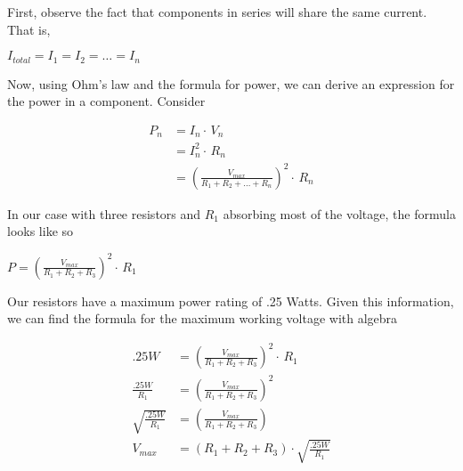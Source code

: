 \documentclass[journal]{IEEEtran}
\begin{document}



First, observe the fact that components in series will share the same current. That is,

\vspace{3mm}
$I_{total}=I_{1}=I_{2}=\dots=I_{n}$
\vspace{3mm}

Now, using Ohm's law and the formula for power, we can derive an expression for the power
in a component. Consider

\begin{align*}
P_{n}&=I_{n}\cdot\,V_{n}\\
&=I_{n}^{2}\cdot\,R_{n}\\
&=\left(\frac{V_{max}}{R_{1}+R_{2}+\dots+R_{n}}\right)^{2}\cdot\,R_{n}
\end{align*}

In our case with three resistors and $R_{1}$ absorbing most of the voltage, the formula
looks like so

\vspace{3mm}
$P=\left(\frac{V_{max}}{R_{1}+R_{2}+R_{3}}\right)^{2}\cdot\,R_{1}$
\vspace{3mm}

Our resistors have a maximum power rating of .25 Watts. Given this information, we can find
the formula for the maximum working voltage with algebra

\begin{align*}
.25W&=\left(\frac{V_{max}}{R_{1}+R_{2}+R_{3}}\right)^{2}\cdot\,R_{1}\\
\frac{.25W}{R_{1}}&=\left(\frac{V_{max}}{R_{1}+R_{2}+R_{3}}\right)^{2}\\
\sqrt{\frac{.25W}{R_{1}}}&=\left(\frac{V_{max}}{R_{1}+R_{2}+R_{3}}\right)\\
V_{max}&=\left(R_{1}+R_{2}+R_{3}\right)\cdot\sqrt{\frac{.25W}{R_{1}}}
\end{align*}
\end{document}
